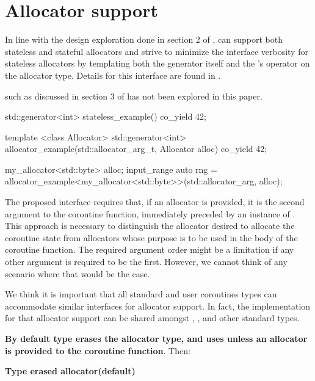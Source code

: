 \documentclass{wg21}
\begin{document}
\section{Allocator support}

In line with the design exploration done in section 2 of ,  can support both stateless and stateful allocators and strive to minimize the interface verbosity for stateless allocators by templating both the generator itself and the 's  operator
on the allocator type. Details for this interface are found in .

 such as discussed in section 3 of  has not been explored in this paper.

\begin{colorblock}
    std::generator<int> stateless_example() {
        co_yield 42;
    }

    template <class Allocator>
    std::generator<int>
    allocator_example(std::allocator_arg_t, Allocator alloc) {
        co_yield 42;
    }

    my_allocator<std::byte> alloc;
    input_range auto rng = allocator_example<my_allocator<std::byte>>(std::allocator_arg, alloc);

\end{colorblock}

The proposed interface requires that, if an allocator is provided, it is the second argument to the coroutine function,
immediately preceded by an instance of .
This approach is necessary to distinguish the allocator desired to allocate the coroutine state from allocators whose purpose is to be used in the body of the coroutine function.
The required argument order might be a limitation if any other argument is required to be the first. However, we cannot think of any scenario where that would be the case.

We think it is important that all standard and user coroutines types can accommodate similar interfaces for allocator support.
In fact, the implementation for that allocator support can be shared amongst , , and other standard types.


\textbf{By default  type erases the allocator type, and uses  unless an allocator is provided to
the coroutine function}.
Then:

\textbf{Type erased allocator(default)}
\end{document}
